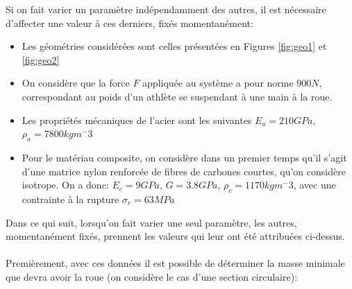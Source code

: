Si on fait varier un paramètre indépendamment des autres, il est nécessaire d'affecter une valeur à ces derniers, fixés momentanément:
\begin{itemize}
	\item Les géométries considérées sont celles présentées en  Figures \ref{fig:geo1} et \ref{fig:geo2}
	\item On considère que la force $F$ appliquée au système a pour norme $900 N$, correspondant au poids d'un athlète se suspendant à une main à la roue.
	\item Les propriétés mécaniques de l'acier sont les suivantes $E_a=210GPa$, $\rho_a=7800 kg m^-3$
	\item Pour le matériau composite, on considère dans un premier temps qu'il s'agit d'une matrice nylon renforcée de fibres de carbones courtes, qu'on considère isotrope. On a donc: $E_c=9 GPa$, $G=3.8 GPa$, $\rho_c=1170 kg m^-3$, avec une contrainte à la rupture $\sigma_r=63 MPa$
\end{itemize}
Dans ce qui suit, lorsqu'on fait varier une seul paramètre, les autres, momentanément fixés, prennent les valeurs qui leur ont été attribuées ci-dessus.
\\
\\ 
Premièrement, avec ces données il est possible de déterminer la masse minimale que devra avoir la roue (on considère le cas d'une section circulaire):
